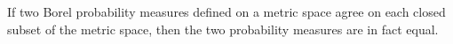 
\begin{corollary}
\mbox{}\vskip 0.1cm
\noindent
If two Borel probability measures defined on a metric space agree on each closed subset of the metric space,
then the two probability measures are in fact equal.
\end{corollary}


\renewcommand{\theenumi}{\roman{enumi}}
\renewcommand{\labelenumi}{\textnormal{(\theenumi)}$\;\;$}

